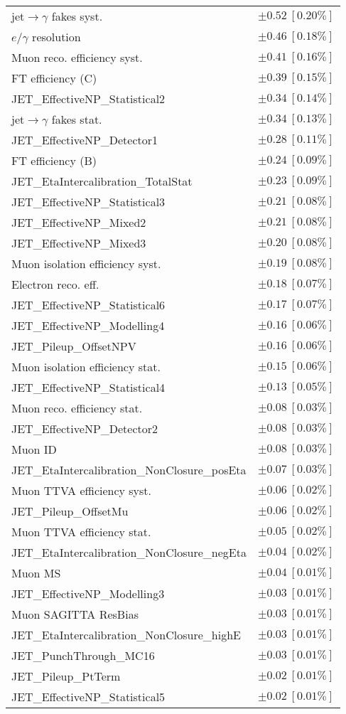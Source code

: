 \begin{tabular}{lr}
jet$\to\gamma$ fakes syst. & $\pm 0.52\ [0.20\%]$ \\
$e/\gamma$ resolution & $\pm 0.46\ [0.18\%]$ \\
Muon reco. efficiency syst. & $\pm 0.41\ [0.16\%]$ \\
FT efficiency (C) & $\pm 0.39\ [0.15\%]$ \\
JET\_EffectiveNP\_Statistical2 & $\pm 0.34\ [0.14\%]$ \\
jet$\to\gamma$ fakes stat. & $\pm 0.34\ [0.13\%]$ \\
JET\_EffectiveNP\_Detector1 & $\pm 0.28\ [0.11\%]$ \\
FT efficiency (B) & $\pm 0.24\ [0.09\%]$ \\
JET\_EtaIntercalibration\_TotalStat & $\pm 0.23\ [0.09\%]$ \\
JET\_EffectiveNP\_Statistical3 & $\pm 0.21\ [0.08\%]$ \\
JET\_EffectiveNP\_Mixed2 & $\pm 0.21\ [0.08\%]$ \\
JET\_EffectiveNP\_Mixed3 & $\pm 0.20\ [0.08\%]$ \\
Muon isolation efficiency syst. & $\pm 0.19\ [0.08\%]$ \\
Electron reco. eff. & $\pm 0.18\ [0.07\%]$ \\
JET\_EffectiveNP\_Statistical6 & $\pm 0.17\ [0.07\%]$ \\
JET\_EffectiveNP\_Modelling4 & $\pm 0.16\ [0.06\%]$ \\
JET\_Pileup\_OffsetNPV & $\pm 0.16\ [0.06\%]$ \\
Muon isolation efficiency stat. & $\pm 0.15\ [0.06\%]$ \\
JET\_EffectiveNP\_Statistical4 & $\pm 0.13\ [0.05\%]$ \\
Muon reco. efficiency stat. & $\pm 0.08\ [0.03\%]$ \\
JET\_EffectiveNP\_Detector2 & $\pm 0.08\ [0.03\%]$ \\
Muon ID & $\pm 0.08\ [0.03\%]$ \\
JET\_EtaIntercalibration\_NonClosure\_posEta & $\pm 0.07\ [0.03\%]$ \\
Muon TTVA efficiency syst. & $\pm 0.06\ [0.02\%]$ \\
JET\_Pileup\_OffsetMu & $\pm 0.06\ [0.02\%]$ \\
Muon TTVA efficiency stat. & $\pm 0.05\ [0.02\%]$ \\
JET\_EtaIntercalibration\_NonClosure\_negEta & $\pm 0.04\ [0.02\%]$ \\
Muon MS & $\pm 0.04\ [0.01\%]$ \\
JET\_EffectiveNP\_Modelling3 & $\pm 0.03\ [0.01\%]$ \\
Muon SAGITTA ResBias & $\pm 0.03\ [0.01\%]$ \\
JET\_EtaIntercalibration\_NonClosure\_highE & $\pm 0.03\ [0.01\%]$ \\
JET\_PunchThrough\_MC16 & $\pm 0.03\ [0.01\%]$ \\
JET\_Pileup\_PtTerm & $\pm 0.02\ [0.01\%]$ \\
JET\_EffectiveNP\_Statistical5 & $\pm 0.02\ [0.01\%]$ \\
\hline
\end{tabular}
